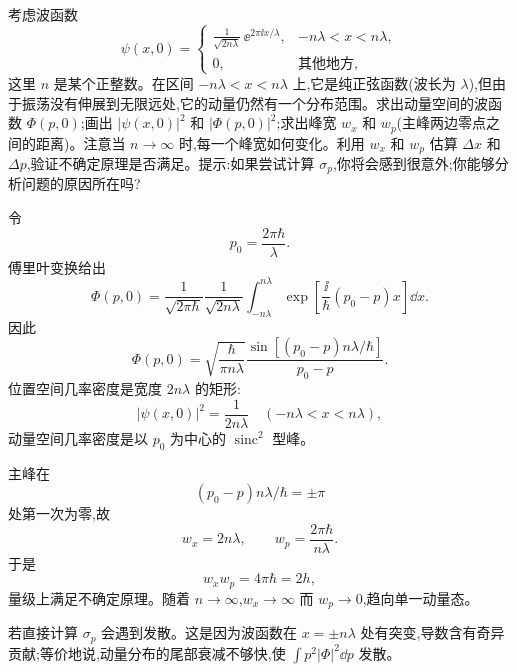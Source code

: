 \begin{question}
考虑波函数
\[
\psi(x,0)=
\begin{cases}
\displaystyle \frac{1}{\sqrt{2n\lambda}}\,\mathrm \ee^{2\pi \ii x/\lambda},& -n\lambda<x<n\lambda,\\[0.4em]
0,& \text{其他地方},
\end{cases}
\]
这里 $n$ 是某个正整数。在区间 $-n\lambda<x<n\lambda$ 上,它是纯正弦函数(波长为 $\lambda$),但由于振荡没有伸展到无限远处,它的动量仍然有一个分布范围。求出动量空间的波函数 $\Phi(p,0)$;画出 $|\psi(x,0)|^2$ 和 $|\Phi(p,0)|^2$;求出峰宽 $w_x$ 和 $w_p$(主峰两边零点之间的距离)。注意当 $n\to\infty$ 时,每一个峰宽如何变化。利用 $w_x$ 和 $w_p$ 估算 $\Delta x$ 和 $\Delta p$,验证不确定原理是否满足。提示:如果尝试计算 $\sigma_p$,你将会感到很意外;你能够分析问题的原因所在吗?
\end{question}
\begin{solution}
令
\[
p_0=\frac{2\pi\hbar}{\lambda}.
\]
傅里叶变换给出
\[
\Phi(p,0)=\frac1{\sqrt{2\pi\hbar}}\frac1{\sqrt{2n\lambda}}
\int_{-n\lambda}^{n\lambda}
\exp\left[\frac{\ii}{\hbar}(p_0-p)x\right]\dd x.
\]
因此
\[
\boxed{\Phi(p,0)=\sqrt{\frac{\hbar}{\pi n\lambda}}
\frac{\sin[(p_0-p)n\lambda/\hbar]}{p_0-p}.}
\]
位置空间几率密度是宽度 $2n\lambda$ 的矩形:
\[
|\psi(x,0)|^2=\frac1{2n\lambda}
\quad(-n\lambda<x<n\lambda),
\]
动量空间几率密度是以 $p_0$ 为中心的 $\operatorname{sinc}^2$ 型峰。

主峰在
\[
(p_0-p)n\lambda/\hbar=\pm\pi
\]
处第一次为零,故
\[
w_x=2n\lambda,
\qquad
w_p=\frac{2\pi\hbar}{n\lambda}.
\]
于是
\[
w_xw_p=4\pi\hbar=2h,
\]
量级上满足不确定原理。随着 $n\to\infty$,$w_x\to\infty$ 而 $w_p\to0$,趋向单一动量态。

若直接计算 $\sigma_p$ 会遇到发散。这是因为波函数在 $x=\pm n\lambda$ 处有突变,导数含有奇异贡献;等价地说,动量分布的尾部衰减不够快,使 $\int p^2|\Phi|^2\dd p$ 发散。
\end{solution}

